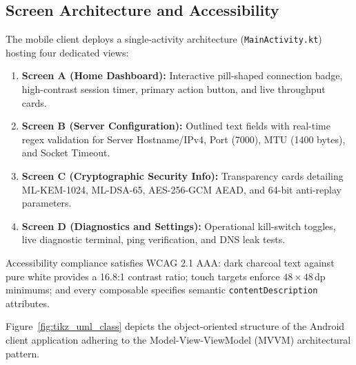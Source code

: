 \subsection{Screen Architecture and Accessibility}
The mobile client deploys a single-activity architecture (\texttt{MainActivity.kt}) hosting four dedicated views:
\begin{enumerate}
    \item \textbf{Screen A (Home Dashboard):} Interactive pill-shaped connection badge, high-contrast session timer, primary action button, and live throughput cards.
    \item \textbf{Screen B (Server Configuration):} Outlined text fields with real-time regex validation for Server Hostname/IPv4, Port (7000), MTU (1400 bytes), and Socket Timeout.
    \item \textbf{Screen C (Cryptographic Security Info):} Transparency cards detailing ML-KEM-1024, ML-DSA-65, AES-256-GCM AEAD, and 64-bit anti-replay parameters.
    \item \textbf{Screen D (Diagnostics and Settings):} Operational kill-switch toggles, live diagnostic terminal, ping verification, and DNS leak tests.
\end{enumerate}
Accessibility compliance satisfies WCAG 2.1 AAA: dark charcoal text against pure white provides a 16.8:1 contrast ratio; touch targets enforce $48 \times 48$\,dp minimums; and every composable specifies semantic \texttt{contentDescription} attributes.

Figure~\ref{fig:tikz_uml_class} depicts the object-oriented structure of the Android client application adhering to the Model-View-ViewModel (MVVM) architectural pattern.

